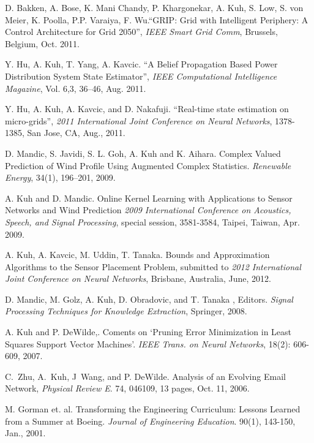 \begin{Publications: Closely Related}

\item  D. Bakken, A. Bose, K. Mani Chandy, P. Khargonekar, A. Kuh, S. Low, S. von Meier, 
K. Poolla, P.P. Varaiya, F. Wu.``GRIP: Grid with Intelligent Periphery: A Control Architecture
for Grid 2050'',  {\it IEEE Smart Grid Comm}, Brussels, Belgium,  Oct. 2011.
\item Y. Hu, A. Kuh, T. Yang, A. Kavcic.
``A Belief Propagation Based Power Distribution System State Estimator'', {\it IEEE Computational Intelligence Magazine}, Vol. 6,3, 36--46,  Aug. 2011.
\item  Y. Hu, A. Kuh, A. Kavcic, and D. Nakafuji. ``Real-time state estimation on micro-grids'',
 {\it 2011 International Joint Conference on Neural Networks}, 1378-1385, San Jose, CA,
Aug., 2011. 
\item
\newblock D. Mandic, S. Javidi, S. L. Goh, A. Kuh and K. Aihara.
\newblock Complex Valued Prediction of Wind Profile Using Augmented Complex Statistics.
\newblock \emph{Renewable Energy}, 34(1), 196--201, 2009.
\item
\newblock A. Kuh and D. Mandic.
\newblock Online Kernel Learning with Applications to Sensor Networks and Wind Prediction
\newblock \emph{2009 International Conference on 
Acoustics, Speech, and Signal Processing}, special session,  3581-3584, Taipei, Taiwan, Apr. 2009.
\end{Publications: Closely Related}


\begin{Publications: Other Significant}
\item
\newblock A. Kuh, A. Kavcic, M. Uddin, T. Tanaka.
\newblock  Bounds and Approximation Algorithms to the Sensor Placement Problem,
\newblock submitted to {\it 2012 International Joint Conference on Neural Networks}, Brisbane,
Australia, June, 2012.
\item
\newblock D.  Mandic, M. Golz, A. Kuh, D. Obradovic, and T. Tanaka , Editors.
\newblock \emph{Signal Processing Techniques for Knowledge Extraction}, Springer, 2008.
\item
\newblock A. Kuh and P. DeWilde,.
\newblock Coments on `Pruning Error Minimization in Least Squares Support Vector Machines'.
\newblock
\emph{IEEE Trans. on Neural Networks}, 18(2): 606-609,  2007.
\item
C.~Zhu, A.~Kuh, J~Wang, and P. DeWilde.
\newblock Analysis of an Evolving Email Network,
\newblock\emph{Physical Review E}. 74, 046109, 13 pages, Oct. 11, 2006.
\item
\newblock M. Gorman et. al.
\newblock Transforming the Engineering Curriculum: Lessons Learned from a Summer at Boeing.
\newblock\emph{Journal of Engineering Education}. 90(1), 143-150, Jan., 2001.
\end{Publications: Other Significant}

